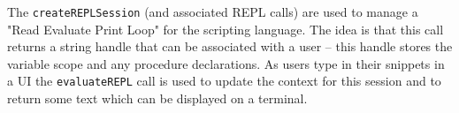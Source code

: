 The \verb+createREPLSession+ (and associated REPL calls) are used to manage a "Read Evaluate Print Loop" for
the \Reflex scripting language. The idea is that this call returns a string handle that can be
associated with a user -- this handle stores the variable scope and any procedure declarations. As
users type in their \Reflex snippets in a UI the \verb+evaluateREPL+ call is used to update the context for this
session and to return some text which can be displayed on a terminal.

